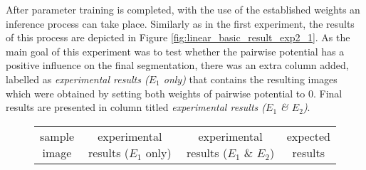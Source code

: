 After parameter training is completed, with the use of the established weights an inference process can take place. Similarly as in the first experiment, the results of this process are depicted in Figure \ref{fig:linear_basic_result_exp2_1}. As the main goal of this experiment was to test whether the pairwise potential has a positive influence on the final segmentation, there was an extra column added, labelled as \textit{experimental results ($E_1$ only)} that contains the resulting images which were obtained by setting both weights of pairwise potential to 0. Final results are presented in column titled \textit{experimental results ($E_1$ \& $E_2$)}.
\begin{figure}[!htb]
 \centering
    \begin{tabular}{cccc}
          \thead{sample \\ image} & \thead{experimental results \\ ($E_1$ only)} & \thead{experimental results \\ ($E_1$ \& $E_2$)} & \thead{expected \\ results} \\


\end{tabular}
\end{figure}
